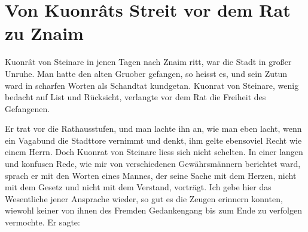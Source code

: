 
\section{Von Kuonr\^{a}ts Streit vor dem Rat zu Znaim}

 Kuonr\^{a}t von Steinare in jenen Tagen nach \gls{Znaim} ritt, war die Stadt in großer Unruhe. Man hatte den alten \gls{Gruober} gefangen, so heisst es, und sein Zutun ward in scharfen Worten als Schandtat kundgetan. \gls{Kuonrat von Steinare}, wenig bedacht auf List und Rücksicht, verlangte vor dem Rat die Freiheit des Gefangenen.

Er trat vor die Rathausstufen, und man lachte ihn an, wie man eben lacht, wenn ein Vagabund die Stadttore vernimmt und denkt, ihm gelte ebensoviel Recht wie einem Herrn. Doch \gls{Kuonrat von Steinare} liess sich nicht schelten. In einer langen und konfusen Rede, wie mir von verschiedenen Gewährsmännern berichtet ward, sprach er mit den Worten eines Mannes, der seine Sache mit dem Herzen, nicht mit dem Gesetz und nicht mit dem Verstand, vorträgt. Ich gebe hier das Wesentliche jener Ansprache wieder, so gut es die Zeugen erinnern konnten, wiewohl keiner von ihnen des Fremden Gedankengang bis zum Ende zu verfolgen vermochte. Er sagte:

